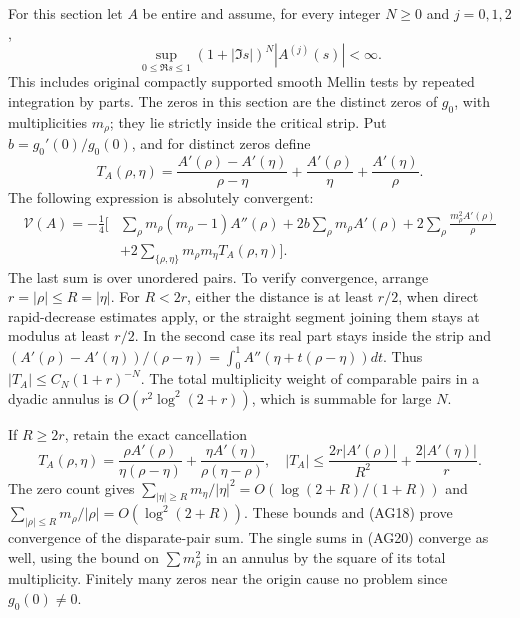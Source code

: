 \documentclass[
  10pt,
  a4paper,
]{article}
\begin{document}
For this section let \(A\) be entire and assume, for every integer
\(N\ge0\) and \(j=0,1,2\), \[
\sup_{0\le\Re s\le1}(1+|\Im s|)^N|A^{(j)}(s)|<\infty.
\tag{AG18}
\] This includes original compactly supported smooth Mellin tests by
repeated integration by parts. The zeros in this section are the
distinct zeros of \(g_0\), with multiplicities \(m_\rho\); they lie
strictly inside the critical strip. Put \(b=g_0'(0)/g_0(0)\), and for
distinct zeros define \[
T_A(\rho,\eta)=\frac{A'(\rho)-A'(\eta)}{\rho-\eta}
+\frac{A'(\rho)}\eta+\frac{A'(\eta)}\rho.
\tag{AG19}
\] The following expression is absolutely convergent: \[
\begin{split}
\mathcal V(A)=-\frac14\Bigg[&\sum_\rho m_\rho(m_\rho-1)A''(\rho)
+2b\sum_\rho m_\rho A'(\rho)
+2\sum_\rho\frac{m_\rho^2A'(\rho)}\rho\\
&+2\sum_{\{\rho,\eta\}}m_\rho m_\eta T_A(\rho,\eta)\Bigg].
\end{split}\tag{AG20}
\] The last sum is over unordered pairs. To verify convergence, arrange
\(r=|\rho|\le R=|\eta|\). For \(R<2r\), either the distance is at least
\(r/2\), when direct rapid-decrease estimates apply, or the straight
segment joining them stays at modulus at least \(r/2\). In the second
case its real part stays inside the strip and
\((A'(\rho)-A'(\eta))/(\rho-\eta)=\int_0^1A''(\eta+t(\rho-\eta))dt\).
Thus \(|T_A|\le C_N(1+r)^{-N}\). The total multiplicity weight of
comparable pairs in a dyadic annulus is \(O(r^2\log^2(2+r))\), which is
summable for large \(N\).

If \(R\ge2r\), retain the exact cancellation \[
T_A(\rho,\eta)=\frac{\rho A'(\rho)}{\eta(\rho-\eta)}
+\frac{\eta A'(\eta)}{\rho(\eta-\rho)},\quad
|T_A|\le\frac{2r|A'(\rho)|}{R^2}+\frac{2|A'(\eta)|}r.
\tag{AG21}
\] The zero count gives
\(\sum_{|\eta|\ge R}m_\eta/|\eta|^2=O(\log(2+R)/(1+R))\) and
\(\sum_{|\rho|\le R}m_\rho/|\rho|=O(\log^2(2+R))\). These bounds and
(AG18) prove convergence of the disparate-pair sum. The single sums in
(AG20) converge as well, using the bound on \(\sum m_\rho^2\) in an
annulus by the square of its total multiplicity. Finitely many zeros
near the origin cause no problem since \(g_0(0)\ne0\).
\end{document}
